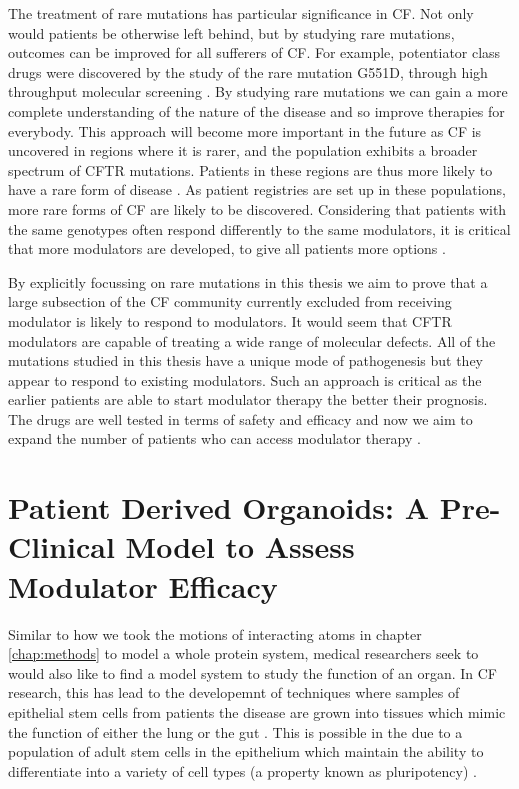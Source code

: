 The treatment of rare mutations has particular significance in CF. Not only would patients be otherwise left behind, but by studying rare mutations, outcomes can be improved for all sufferers of CF. For example, potentiator class drugs were discovered by the study of the rare mutation G551D, through high throughput molecular screening \cite{vangoor2009}. By studying rare mutations we can gain a more complete understanding of the nature of the disease and so improve therapies for everybody. This approach will become more important in the future as CF is uncovered in regions where it is rarer, and the population exhibits a broader spectrum of CFTR mutations. Patients in these regions are thus more likely to have a rare form of disease \cite{singh2015,zheng2017,ni2022}. As patient registries are set up in these populations, more rare forms of CF are likely to be discovered\cite{zheng2017}. Considering that patients with the same genotypes often respond differently to the same modulators, it is critical that more modulators are developed, to give all patients more options \cite{}.


By explicitly focussing on rare mutations in this thesis we aim to prove that a large subsection of the CF community currently excluded from receiving modulator is likely to respond to modulators. It would seem that CFTR modulators are capable of treating a wide range of molecular defects. All of the mutations studied in this thesis have a unique mode of pathogenesis but they appear to respond to existing modulators. Such an approach is critical as the earlier patients are able to start modulator therapy the better their prognosis. The drugs are well tested in terms of safety and efficacy and now we aim to expand the number of patients who can access modulator therapy \cite{}.

\section{Patient Derived Organoids: A Pre-Clinical Model to Assess Modulator Efficacy}
Similar to how we took the motions of interacting atoms in chapter \ref{chap:methods} to model a whole protein system, medical researchers seek to would also like to find a model system to study the function of an organ. In CF research, this has lead to the developemnt of techniques where samples of epithelial stem cells from patients the disease are grown into tissues which mimic the function of either the lung or the gut \cite{wong2015,depoel2020}. This is possible in the due to a population of adult stem cells in the epithelium which maintain the ability to differentiate into a variety of cell types (a property known as pluripotency) \cite{}. 

